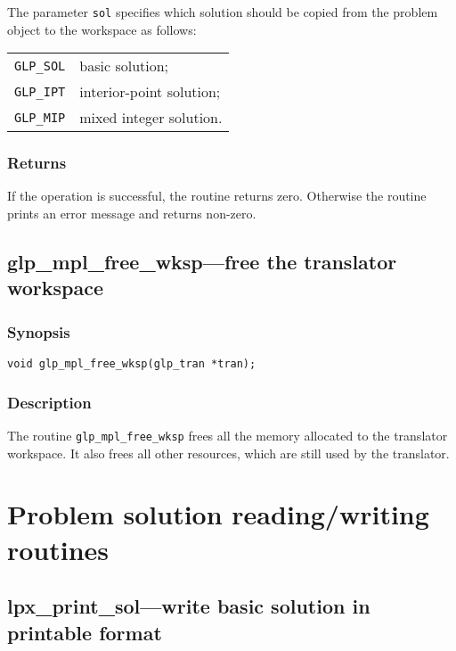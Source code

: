 The parameter \verb|sol| specifies which solution should be copied
from the problem object to the workspace as follows:

\begin{tabular}{@{}ll}
\verb|GLP_SOL| & basic solution; \\
\verb|GLP_IPT| & interior-point solution; \\
\verb|GLP_MIP| & mixed integer solution. \\
\end{tabular}

\subsubsection*{Returns}

If the operation is successful, the routine returns zero. Otherwise
the routine prints an error message and returns non-zero.

\subsection{glp\_mpl\_free\_wksp---free the translator workspace}

\subsubsection*{Synopsis}

\begin{verbatim}
void glp_mpl_free_wksp(glp_tran *tran);
\end{verbatim}

\subsubsection*{Description}

The routine \verb|glp_mpl_free_wksp| frees all the memory allocated to
the translator workspace. It also frees all other resources, which are
still used by the translator.


\newpage

\section{Problem solution reading/writing routines}

\subsection{lpx\_print\_sol---write basic solution in printable
format}

